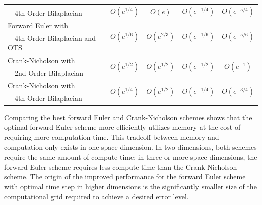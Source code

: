 \documentclass[oneeqnum,onefignum,onetabnum,onethmnum]{siamltex}
\begin{document}
\begin{table}[tb]
\begin{minipage}{\textwidth}
\begin{center}
\begin{tabular}{|l|c|c|c|c|}
    & \multirow{2}{*}{$O\left( e^{1/4} \right)$}
    & \multirow{2}{*}{$O\left( e \right)$}
    & \multirow{2}{*}{$O\left( e^{-1/4} \right)$} 
    & \multirow{2}{*}{$O\left( e^{-{5/4}} \right)$} \\
  \ \ 4th-Order Bilaplacian & & & & \\
  \hline 
  Forward Euler with 
    & \multirow{2}{*}{$O\left( e^{1/6} \right)$} 
    & \multirow{2}{*}{$O\left( e^{2/3} \right)$} 
    & \multirow{2}{*}{$O\left( e^{-1/6} \right)$} 
    & \multirow{2}{*}{$O\left( e^{-5/6} \right)$} \\ 
  \ \ 4th-Order Bilaplacian and OTS & & & & \\
  \hline 
  Crank-Nicholson with 
    & \multirow{2}{*}{$O\left( e^{1/2} \right)$} 
    & \multirow{2}{*}{$O\left( e^{1/2} \right)$} 
    & \multirow{2}{*}{$O\left( e^{-1/2} \right)$} 
    & \multirow{2}{*}{$O\left( e^{-1} \right)$} \\
  \ \ 2nd-Order Bilaplacian & & & & \\
  \hline 
  Crank-Nicholson with 
    & \multirow{2}{*}{$O\left( e^{1/4} \right)$} 
    & \multirow{2}{*}{$O\left( e^{1/2} \right)$} 
    & \multirow{2}{*}{$O\left( e^{-1/4} \right)$} 
    & \multirow{2}{*}{$O\left( e^{-3/4} \right)$} \\
  \ \ 4th-Order Bilaplacian & & & & \\
  \hline
\end{tabular}
\end{center}
\end{minipage}
\end{table}

Comparing the best forward Euler and Crank-Nicholson schemes shows that
the optimal forward Euler scheme more efficiently utilizes memory at the
cost of requiring more computation time.  This tradeoff between memory and 
computation only exists in one space dimension.  In two-dimensions, both 
schemes require the same amount of compute time; in three or more space 
dimensions, the forward Euler scheme requires less compute time than the
Crank-Nicholson scheme.  The origin of the improved performance for the 
forward Euler scheme with optimal time step in higher dimensions is the 
significantly smaller size of the computational grid required to achieve a 
desired error level.
\end{document}
